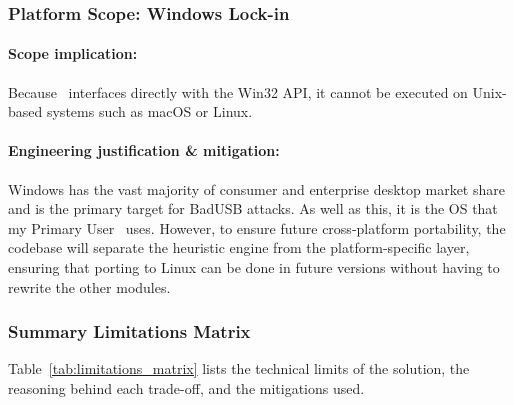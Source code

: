 \subsubsection{Platform Scope: Windows Lock-in}

\paragraph{Scope implication:}
Because \projectNameFormatted\ interfaces directly with the Win32 API, it cannot be executed on Unix-based systems such as macOS or Linux.

\paragraph{Engineering justification \& mitigation:}
Windows has the vast majority of consumer and enterprise desktop market share and is the primary target for BadUSB attacks. As well as this, it is the OS that my Primary User \stakeholdersPU\ uses. However, to ensure future cross-platform portability, the codebase will separate the heuristic engine from the platform-specific layer, ensuring that porting to Linux can be done in future versions without having to rewrite the other modules.

\subsubsection{Summary Limitations Matrix}

Table~\ref{tab:limitations_matrix} lists the technical limits of the solution, the reasoning behind each trade-off, and the mitigations used.

